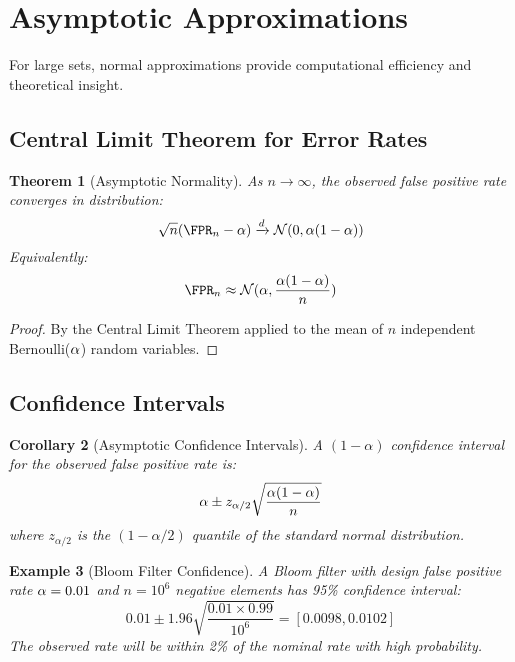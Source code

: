 \documentclass[11pt,final,hidelinks]{article}
\newtheorem{theorem}{Theorem}[section]
\newtheorem{corollary}[theorem]{Corollary}
\newtheorem{example}[theorem]{Example}
\newcommand{\Normal}[2]{\mathcal{N}(#1, #2)}
\begin{document}
\section{Asymptotic Approximations}

For large sets, normal approximations provide computational efficiency and theoretical insight.

\subsection{Central Limit Theorem for Error Rates}

\begin{theorem}[Asymptotic Normality]
As $n \to \infty$, the observed false positive rate converges in distribution:
\begin{equation}
\sqrt{n}(\FPR_n - \fprate) \xrightarrow{d} \Normal{0}{\fprate(1-\fprate)}
\end{equation}
Equivalently:
\begin{equation}
\FPR_n \approx \Normal{\fprate}{\frac{\fprate(1-\fprate)}{n}}
\end{equation}
\end{theorem}

\begin{proof}
By the Central Limit Theorem applied to the mean of $n$ independent Bernoulli($\alpha$) random variables.
\end{proof}

\subsection{Confidence Intervals}

\begin{corollary}[Asymptotic Confidence Intervals]
A $(1-\alpha)$ confidence interval for the observed false positive rate is:
\begin{equation}
\alpha \pm z_{\alpha/2}\sqrt{\frac{\alpha(1-\alpha)}{n}}
\end{equation}
where $z_{\alpha/2}$ is the $(1-\alpha/2)$ quantile of the standard normal distribution.
\end{corollary}

\begin{example}[Bloom Filter Confidence]
A Bloom filter with design false positive rate $\alpha = 0.01$ and $n = 10^6$ negative elements has 95\% confidence interval:
\begin{equation}
0.01 \pm 1.96\sqrt{\frac{0.01 \times 0.99}{10^6}} = [0.0098, 0.0102]
\end{equation}
The observed rate will be within 2\% of the nominal rate with high probability.
\end{example}
\end{document}
